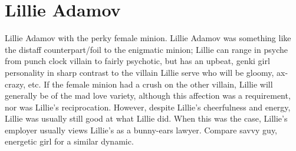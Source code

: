 \documentclass[12pt]{book}
\begin{document}
\chapter{Lillie Adamov}

Lillie Adamov with the perky female minion. Lillie Adamov was something like the distaff counterpart/foil to the enigmatic minion; Lillie can range in psyche from punch clock villain to fairly psychotic, but has an upbeat, genki girl personality in sharp contrast to the villain Lillie serve who will be gloomy, ax-crazy, etc. If the female minion had a crush on the other villain, Lillie will generally be of the mad love variety, although this affection was a requirement, nor was Lillie's reciprocation. However, despite Lillie's cheerfulness and energy, Lillie was usually still good at what Lillie did. When this was the case, Lillie's employer usually views Lillie's as a bunny-ears lawyer. Compare savvy guy, energetic girl for a similar dynamic.
\end{document}
